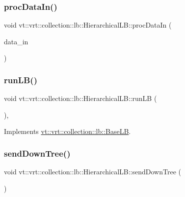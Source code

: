 \subsubsection{\texorpdfstring{proc\+Data\+In()}{procDataIn()}}
{\footnotesize\ttfamily void vt\+::vrt\+::collection\+::lb\+::\+Hierarchical\+L\+B\+::proc\+Data\+In (\begin{DoxyParamCaption}\item[{\hyperlink{structvt_1_1vrt_1_1collection_1_1lb_1_1_base_l_b_aa286d31a0820a8fc9218ccb858368fca}{Element\+Load\+Type} const \&}]{data\+\_\+in }\end{DoxyParamCaption})}

\mbox{\label{structvt_1_1vrt_1_1collection_1_1lb_1_1_hierarchical_l_b_a6affae1554d9c0734db0d538b9b26e4d}} 
\subsubsection{\texorpdfstring{run\+L\+B()}{runLB()}}
{\footnotesize\ttfamily void vt\+::vrt\+::collection\+::lb\+::\+Hierarchical\+L\+B\+::run\+LB (\begin{DoxyParamCaption}{ }\end{DoxyParamCaption})\hspace{0.3cm}{\ttfamily [override]}, {\ttfamily [virtual]}}



Implements \hyperlink{structvt_1_1vrt_1_1collection_1_1lb_1_1_base_l_b_a69a398c54f8129f365171a1189ffcd84}{vt\+::vrt\+::collection\+::lb\+::\+Base\+LB}.

\mbox{\label{structvt_1_1vrt_1_1collection_1_1lb_1_1_hierarchical_l_b_a1b7abcf40a8dfb63e9a2ee0842af413b}} 
\subsubsection{\texorpdfstring{send\+Down\+Tree()}{sendDownTree()}}
{\footnotesize\ttfamily void vt\+::vrt\+::collection\+::lb\+::\+Hierarchical\+L\+B\+::send\+Down\+Tree (\begin{DoxyParamCaption}{ }\end{DoxyParamCaption})\hspace{0.3cm}{\ttfamily [private]}}

